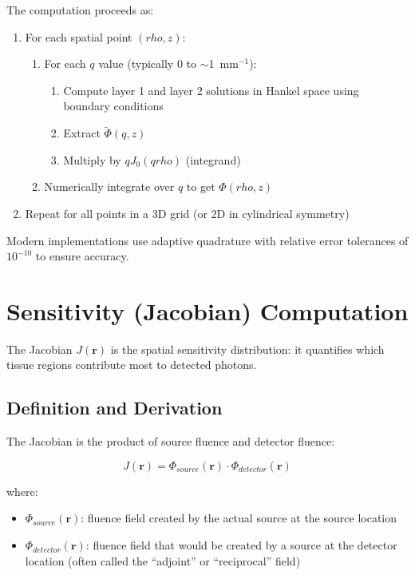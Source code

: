 \documentclass[12pt]{article}
\def\rho{rho}%
\def\text#1{#1}%
\def\,{ }%
\begin{document}
The computation proceeds as:

\begin{enumerate}
\item For each spatial point $(\rho, z)$:
 \begin{enumerate}
 \item For each $q$ value (typically 0 to $\sim$1~mm$^{-1}$):
 \begin{enumerate}
 \item Compute layer 1 and layer 2 solutions in Hankel space using boundary conditions
 \item Extract $\tilde{\Phi}(q, z)$
 \item Multiply by $q \, J_0(q\rho)$ (integrand)
 \end{enumerate}
 \item Numerically integrate over $q$ to get $\Phi(\rho, z)$
 \end{enumerate}
\item Repeat for all points in a 3D grid (or 2D in cylindrical symmetry)
\end{enumerate}

Modern implementations use adaptive quadrature with relative error tolerances of $10^{-10}$ to ensure accuracy.

\section{Sensitivity (Jacobian) Computation}

The Jacobian $J(\mathbf{r})$ is the spatial sensitivity distribution: it quantifies which tissue regions contribute most to detected photons.

\subsection{Definition and Derivation}

The Jacobian is the product of source fluence and detector fluence:

\begin{equation}
J(\mathbf{r}) = \Phi_{\text{source}}(\mathbf{r}) \cdot \Phi_{\text{detector}}(\mathbf{r})
\end{equation}

where:
\begin{itemize}
\item $\Phi_{\text{source}}(\mathbf{r})$: fluence field created by the actual source at the source location
\item $\Phi_{\text{detector}}(\mathbf{r})$: fluence field that would be created by a source at the detector location (often called the ``adjoint'' or ``reciprocal'' field)
\end{itemize}
\end{document}
